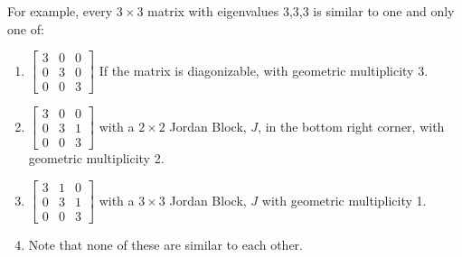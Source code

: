 For example, every $3 \times 3$ matrix with eigenvalues 3,3,3 is similar to one and only one of:
\begin{enumerate}
\item $\begin{bmatrix}
    3 & 0 & 0  \\   0 & 3 & 0 \\  0 & 0 & 3
    \end{bmatrix}$ If the matrix is diagonizable, with geometric multiplicity 3.
\item $\begin{bmatrix}
    3 & 0 & 0  \\   0 & 3 & 1 \\  0 & 0 & 3
    \end{bmatrix}$ with a $2 \times 2$ Jordan Block, $J$, in the bottom right corner, with geometric multiplicity 2.
\item $\begin{bmatrix}
    3 & 1 & 0  \\   0 & 3 & 1 \\  0 & 0 & 3
    \end{bmatrix}$ with a $3 \times 3$ Jordan Block, $J$ with geometric multiplicity 1.
\item Note that none of these are similar to each other.
\end{enumerate}
